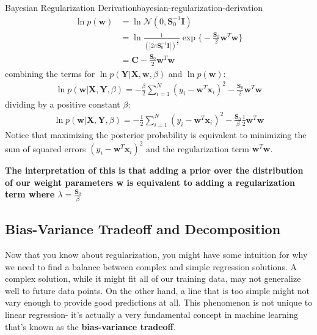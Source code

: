 \begin{derivation}{Bayesian Regularization Derivation}{bayesian-regularization-derivation}
    \begin{align*}
        \ln{p(\textbf{w})} &= \ln{\mathcal{N}(0, \boldsymbol{S}_{0}^{-1}\textbf{I})} \\
        &= \ln{\frac{1}{(|2\pi\boldsymbol{S}_{0}^{-1}\textbf{I}|)^{\frac{1}{2}}} \exp{\bigg\{-\frac{\boldsymbol{S}_{0}}{2} \textbf{w}^{T}\textbf{w}\bigg\}}} \\
        &= \textbf{C} -\frac{\boldsymbol{S}_{0}}{2} \textbf{w}^{T}\textbf{w}
    \end{align*}
    combining the terms for $\ln{p(\textbf{Y}| \textbf{X}, \textbf{w}, \beta)}$ and $\ln{p(\textbf{w})}$:
    \begin{align*}
        \ln{p(\textbf{w}|\textbf{X},\textbf{Y}, \beta)} = -\frac{\beta}{2}\sum_{i=1}^{N} (y_{i} - \textbf{w}^{T} \textbf{x}_{i})^2 - \frac{\boldsymbol{S}_{0}}{2} \textbf{w}^{T}\textbf{w}
    \end{align*}
    dividing by a positive constant $\beta$:
    \begin{align*}
        \ln{p(\textbf{w}|\textbf{X},\textbf{Y}, \beta)} = -\frac{1}{2}\sum_{i=1}^{N} (y_{i} - \textbf{w}^{T} \textbf{x}_{i})^2 - \frac{\boldsymbol{S}_{0}}{\beta}\frac{1}{2} \textbf{w}^{T}\textbf{w}
    \end{align*}
    Notice that maximizing the posterior probability is equivalent to minimizing the sum of squared errors $(y_{i} - \textbf{w}^{T} \textbf{x}_{i})^2$ and the regularization term $\textbf{w}^{T}\textbf{w}$.
\end{derivation}

\textbf{The interpretation of this is that adding a prior over the distribution of our weight parameters \textbf{w} is equivalent to adding a regularization term where $\lambda = \frac{\boldsymbol{S}_{0}}{\beta}$}

\subsection{Bias-Variance Tradeoff and Decomposition}
Now that you know about regularization, you might have some intuition for why we need to find a balance between complex and simple regression solutions. A complex solution, while it might fit all of our training data, may not generalize well to future data points. On the other hand, a line that is too simple might not vary enough to provide good predictions at all. This phenomenon is not unique to linear regression- it's actually a very fundamental concept in machine learning that's known as the \textbf{bias-variance tradeoff}.

